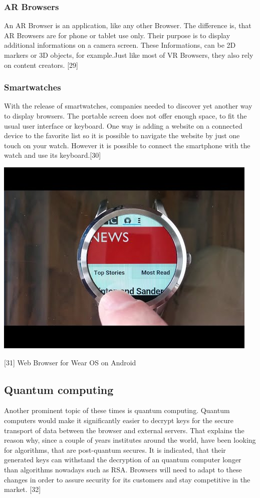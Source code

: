 \documentclass[runningheads]{llncs}
\begin{document}
			\subsubsection{AR Browsers}
				\leavevmode\newline
				An AR Browser is an application, like any other Browser. The difference is, that AR Browsers are for phone or tablet use only. Their purpose is to display additional informations on a camera screen. These Informations, can be 2D markers or 3D objects, for example.Just like most of VR Browsers, they also rely on content creators. 
				[29]
			\subsubsection{Smartwatches}
			\leavevmode\newline
			With the release of smartwatches, companies needed to discover yet another way to display browsers. The portable screen does not offer enough space, to fit the usual user interface or keyboard. One way is adding a website on a connected device to the favorite list so it is possible to navigate the website by just one touch on your watch.	
			 However it is possible to connect the smartphone with the watch and use its keyboard.[30]
			\begin{center}
				\includegraphics[scale=0.35]{Smartwatch.jpg}
				
				[31] Web Browser for Wear OS on Android	
			\end{center}
		\subsection{Quantum computing}
		\leavevmode\newline
		Another prominent topic of these times is quantum computing. Quantum computers would make it significantly easier to decrypt keys for the secure transport of data between the browser and external servers. That explains the reason why, since a couple of years institutes around the world, have been looking for algorithms, that are post-quantum secures. It is indicated, that their generated keys can withstand the decryption of an quantum computer longer than algorithms nowadays such as RSA. Browsers will need to adapt to these changes in order to assure security for its customers and stay competitive in the market.
			[32]
\end{document}
